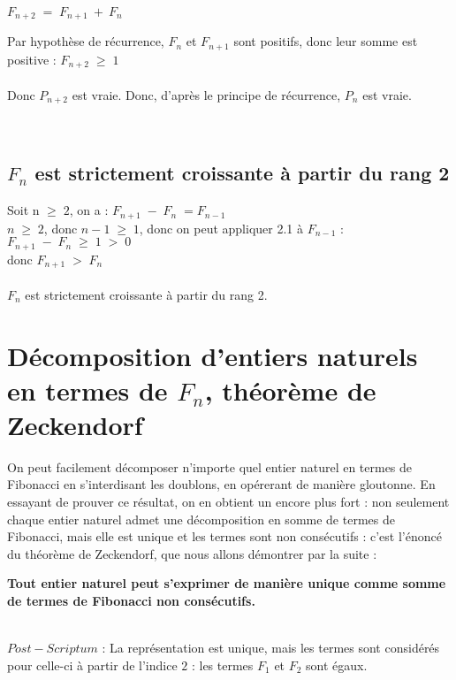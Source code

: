 \documentclass{article}
\begin{document}
$F_{n+2} \; = \; F_{n+1} \: + \: F_n $ 

Par hypothèse de récurrence, $F_n$ et $F_{n+1}$ sont positifs, donc leur somme est positive : $F_{n+2} \; \geq \; 1$\\
\\
Donc $P_{n+2}$ est vraie. Donc, d'après le principe de récurrence, $P_n$ est vraie.

\\
\subsection{$F_n$ est strictement croissante à partir du rang 2}

Soit n $\geq \; 2$, on a : 
$F_{n+1} \; - \; F_n \; = F_{n-1}$\\
$n \; \geq \; 2$, donc $n-1 \; \geq \; 1$, donc on peut appliquer 2.1 à $F_{n-1}$ :  $F_{n+1} \; - \; F_n \; \geq \; 1 \; > \; 0$\\

donc $F_{n+1} \; > \; F_n$\\
\\
$F_n$ est strictement croissante à partir du rang 2.



\section{Décomposition d'entiers naturels en termes de $F_n$, 
théorème de Zeckendorf}

On peut facilement décomposer n'importe quel entier naturel en termes de Fibonacci en s'interdisant les doublons, en opérerant de manière gloutonne.
En essayant de prouver ce résultat, on en obtient un encore plus fort :
non seulement chaque entier naturel admet une décomposition en somme de termes de Fibonacci, mais elle est unique et les termes sont non consécutifs : c'est l'énoncé du théorème de Zeckendorf, que nous allons démontrer par la suite :\\


\begin{center}
    \textbf{Tout entier naturel peut s'exprimer de manière unique comme somme de termes de Fibonacci non consécutifs.}
\end{center}\\


$Post-Scriptum$ : La représentation est unique, mais les termes sont considérés pour celle-ci à partir de l'indice $2$ : les termes $F_1$ et $F_2$ sont égaux.
\end{document}
